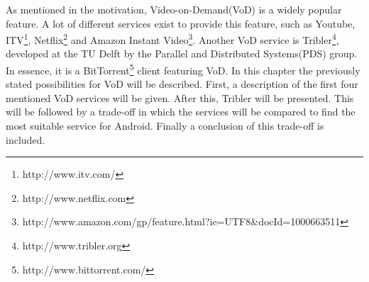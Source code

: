 As mentioned in the motivation, Video-on-Demand(VoD) is a widely popular feature. A lot of different services exist to provide this feature, such as Youtube, ITV\footnote{http://www.itv.com/}, Netflix\footnote{http://www.netflix.com} and Amazon Instant Video\footnote{http://www.amazon.com/gp/feature.html?ie=UTF8\&docId=1000663511}. Another VoD service is Tribler\footnote{http://www.tribler.org}, developed at the TU Delft by the Parallel and Distributed Systems(PDS) group. In essence, it is a BitTorrent\footnote{http://www.bittorrent.com/} client featuring VoD. In this chapter the previously stated possibilities for VoD will be described. First, a description of the first four mentioned VoD services will be given. After this, Tribler will be presented. This will be followed by a trade-off in which the services will be compared to find the most suitable service for Android. Finally a conclusion of this trade-off is included.